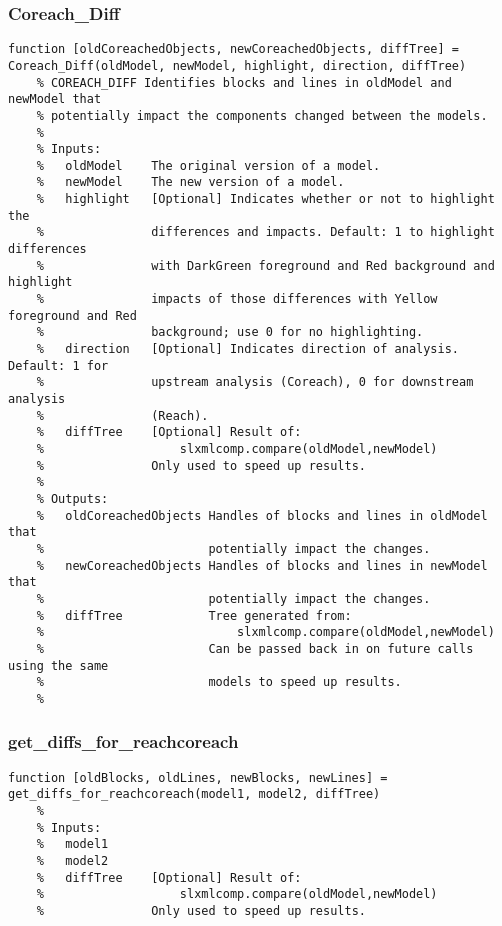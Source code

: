 \documentclass[12pt,letterpaper]{report}
\begin{document}
		\subsubsection{Coreach\_Diff}
\begin{lstlisting}
function [oldCoreachedObjects, newCoreachedObjects, diffTree] = Coreach_Diff(oldModel, newModel, highlight, direction, diffTree)
    % COREACH_DIFF Identifies blocks and lines in oldModel and newModel that
    % potentially impact the components changed between the models.
    % 
    % Inputs:
    %   oldModel    The original version of a model.
    %   newModel    The new version of a model.
    %   highlight   [Optional] Indicates whether or not to highlight the
    %               differences and impacts. Default: 1 to highlight differences
    %               with DarkGreen foreground and Red background and highlight
    %               impacts of those differences with Yellow foreground and Red
    %               background; use 0 for no highlighting.
    %   direction   [Optional] Indicates direction of analysis. Default: 1 for
    %               upstream analysis (Coreach), 0 for downstream analysis
    %               (Reach).
    %   diffTree    [Optional] Result of:
    %                   slxmlcomp.compare(oldModel,newModel)
    %               Only used to speed up results.
    %
    % Outputs:
    %   oldCoreachedObjects Handles of blocks and lines in oldModel that 
    %                       potentially impact the changes.
    %   newCoreachedObjects Handles of blocks and lines in newModel that 
    %                       potentially impact the changes.
    %   diffTree            Tree generated from:
    %                           slxmlcomp.compare(oldModel,newModel)
    %                       Can be passed back in on future calls using the same
    %                       models to speed up results.
    % 
\end{lstlisting}
		\subsubsection{get\_diffs\_for\_reachcoreach}
\begin{lstlisting}
function [oldBlocks, oldLines, newBlocks, newLines] = get_diffs_for_reachcoreach(model1, model2, diffTree)
    %
    % Inputs:
    %   model1
    %   model2
    %   diffTree    [Optional] Result of:
    %                   slxmlcomp.compare(oldModel,newModel)
    %               Only used to speed up results.
\end{lstlisting}
\end{document}
